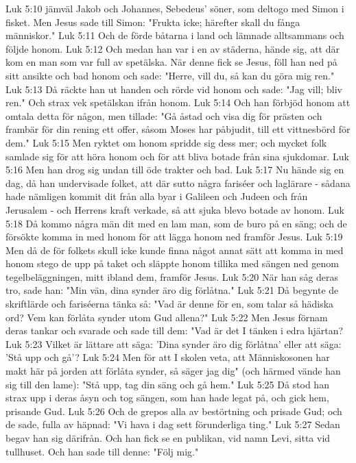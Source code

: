 Luk 5:10  jämväl Jakob och Johannes, Sebedeus' söner, som deltogo med Simon i fisket. Men Jesus sade till Simon: "Frukta icke; härefter skall du fånga människor."
Luk 5:11  Och de förde båtarna i land och lämnade alltsammans och följde honom.
Luk 5:12  Och medan han var i en av städerna, hände sig, att där kom en man som var full av spetälska. När denne fick se Jesus, föll han ned på sitt ansikte och bad honom och sade: "Herre, vill du, så kan du göra mig ren."
Luk 5:13  Då räckte han ut handen och rörde vid honom och sade: "Jag vill; bliv ren." Och strax vek spetälskan ifrån honom.
Luk 5:14  Och han förbjöd honom att omtala detta för någon, men tillade: "Gå åstad och visa dig för prästen och frambär för din rening ett offer, såsom Moses har påbjudit, till ett vittnesbörd för dem."
Luk 5:15  Men ryktet om honom spridde sig dess mer; och mycket folk samlade sig för att höra honom och för att bliva botade från sina sjukdomar.
Luk 5:16  Men han drog sig undan till öde trakter och bad.
Luk 5:17  Nu hände sig en dag, då han undervisade folket, att där sutto några fariséer och laglärare - sådana hade nämligen kommit dit från alla byar i Galileen och Judeen och från Jerusalem - och Herrens kraft verkade, så att sjuka blevo botade av honom.
Luk 5:18  Då kommo några män dit med en lam man, som de buro på en säng; och de försökte komma in med honom för att lägga honom ned framför Jesus.
Luk 5:19  Men då de för folkets skull icke kunde finna något annat sätt att komma in med honom stego de upp på taket och släppte honom tillika med sängen ned genom tegelbeläggningen, mitt ibland dem, framför Jesus.
Luk 5:20  När han såg deras tro, sade han: "Min vän, dina synder äro dig förlåtna."
Luk 5:21  Då begynte de skriftlärde och fariséerna tänka så: "Vad är denne för en, som talar så hädiska ord? Vem kan förlåta synder utom Gud allena?"
Luk 5:22  Men Jesus förnam deras tankar och svarade och sade till dem: "Vad är det I tänken i edra hjärtan?
Luk 5:23  Vilket är lättare att säga: 'Dina synder äro dig förlåtna' eller att säga: 'Stå upp och gå'?
Luk 5:24  Men för att I skolen veta, att Människosonen har makt här på jorden att förlåta synder, så säger jag dig" (och härmed vände han sig till den lame): "Stå upp, tag din säng och gå hem."
Luk 5:25  Då stod han strax upp i deras åsyn och tog sängen, som han hade legat på, och gick hem, prisande Gud.
Luk 5:26  Och de grepos alla av bestörtning och prisade Gud; och de sade, fulla av häpnad: "Vi hava i dag sett förunderliga ting."
Luk 5:27  Sedan begav han sig därifrån. Och han fick se en publikan, vid namn Levi, sitta vid tullhuset. Och han sade till denne: "Följ mig."

